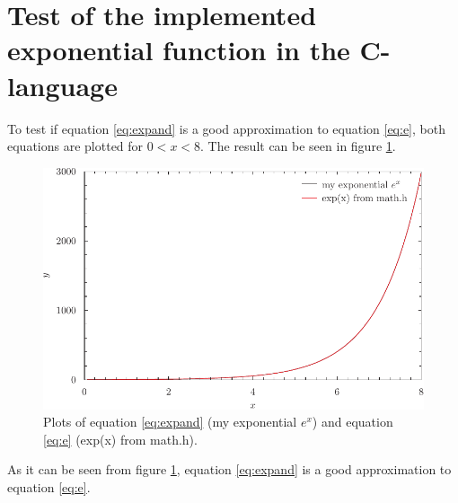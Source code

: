 \documentclass{article}
\begin{document}
\section{Test of the implemented exponential function in the C-language}
To test if equation \ref{eq:expand} is a good approximation to equation \ref{eq:e}, both equations are plotted for
$0<x<8$. The result can be seen in figure \ref{fig:exp}.

\begin{figure}
\centering
\includegraphics{fig.pdf}
\caption{Plots of equation \ref{eq:expand} (my exponential $e^x$) and equation \ref{eq:e} (exp(x) from math.h).}
\label{fig:exp}
\end{figure}

As it can be seen from figure \ref{fig:exp}, equation \ref{eq:expand} is a good approximation to equation \ref{eq:e}.
\end{document}
